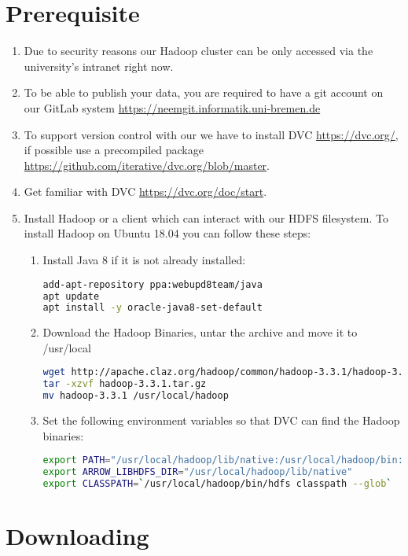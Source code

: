 \section{Prerequisite}
\begin{enumerate}
	\item Due to security reasons our Hadoop cluster can be only accessed via the university's intranet right now.	
	\item To be able to publish your data, you are required to have a git account on our GitLab system
	\url{https://neemgit.informatik.uni-bremen.de} 
	\item To support version control with our \neems we have to install DVC \url{https://dvc.org/}, if possible use a precompiled package \url{https://github.com/iterative/dvc.org/blob/master}.
	\item Get familiar with DVC \url{https://dvc.org/doc/start}.
	\item Install Hadoop or a client which can interact with our HDFS filesystem. To install Hadoop on Ubuntu 18.04 you can follow these steps:
	\begin{enumerate}
		\item Install Java 8 if it is not already installed:
\begin{lstlisting}[language=bash, caption=Install Java]
add-apt-repository ppa:webupd8team/java
apt update
apt install -y oracle-java8-set-default
\end{lstlisting}
		\item Download the Hadoop Binaries, untar the archive and move it to /usr/local
\begin{lstlisting}[language=bash, caption=Install Hadoop Binaries]
wget http://apache.claz.org/hadoop/common/hadoop-3.3.1/hadoop-3.3.1.tar.gz
tar -xzvf hadoop-3.3.1.tar.gz
mv hadoop-3.3.1 /usr/local/hadoop
\end{lstlisting}
		\item Set the following environment variables so that DVC can find the Hadoop binaries:
\begin{lstlisting}[language=bash, caption=Export environment variables for Hadoop]
export PATH="/usr/local/hadoop/lib/native:/usr/local/hadoop/bin:/usr/local/hadoop/sbin:$PATH"
export ARROW_LIBHDFS_DIR="/usr/local/hadoop/lib/native"
export CLASSPATH=`/usr/local/hadoop/bin/hdfs classpath --glob`
\end{lstlisting}		
	\end{enumerate}
\end{enumerate}

\section{Downloading}


